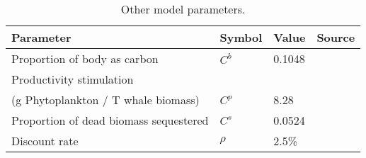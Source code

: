 \begin{table}

\caption{\label{tab:global_params}Other model parameters.}
\centering
\begin{tabular}[t]{llll}
\toprule
Parameter & Symbol & Value & Source\\
\midrule
Proportion of body as carbon & $C^b$ & 0.1048 & \cite{jelmert1996whaling}\\
Productivity stimulation\\(g Phytoplankton / T whale biomass) & $C^p$ & 8.28 & \cite{savoca2021baleen}\\
Proportion of dead biomass sequestered & $C^s$ & 0.0524 & \cite{pershing2010impact}\\
Discount rate & $\rho$ & 2.5\% & \cite{interagency2021technical}\\
\bottomrule
\end{tabular}
\end{table}